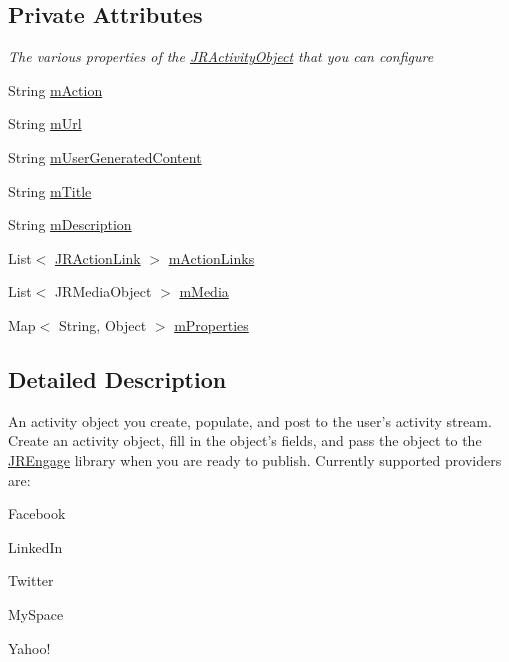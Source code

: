 \subsection*{Private Attributes}
\begin{Indent}{\bf }\par
{\em \label{_amgrpd41d8cd98f00b204e9800998ecf8427e}
 The various properties of the \hyperlink{classcom_1_1janrain_1_1android_1_1engage_1_1types_1_1_j_r_activity_object}{JRActivityObject} that you can configure }\begin{DoxyCompactItemize}
\item 
String \hyperlink{classcom_1_1janrain_1_1android_1_1engage_1_1types_1_1_j_r_activity_object_a23a0fef34f1a97a5566ae77ab6ee7d70}{mAction}
\item 
String \hyperlink{classcom_1_1janrain_1_1android_1_1engage_1_1types_1_1_j_r_activity_object_ab34fa6a32bb5e2724ccf38e29b8deedb}{mUrl}
\item 
String \hyperlink{classcom_1_1janrain_1_1android_1_1engage_1_1types_1_1_j_r_activity_object_ae94df254bffa6663d441027d7d8275c0}{mUserGeneratedContent}
\item 
String \hyperlink{classcom_1_1janrain_1_1android_1_1engage_1_1types_1_1_j_r_activity_object_a6a07e9575c466f0cfeb02907ae8d0973}{mTitle}
\item 
String \hyperlink{classcom_1_1janrain_1_1android_1_1engage_1_1types_1_1_j_r_activity_object_a6393a44879537429fc8269dda0086f20}{mDescription}
\item 
List$<$ \hyperlink{classcom_1_1janrain_1_1android_1_1engage_1_1types_1_1_j_r_action_link}{JRActionLink} $>$ \hyperlink{classcom_1_1janrain_1_1android_1_1engage_1_1types_1_1_j_r_activity_object_a9808cd0aa65b882929ba8be9a974b496}{mActionLinks}
\item 
List$<$ JRMediaObject $>$ \hyperlink{classcom_1_1janrain_1_1android_1_1engage_1_1types_1_1_j_r_activity_object_a3d89cbb011a9839da0b559556acad5f3}{mMedia}
\item 
Map$<$ String, Object $>$ \hyperlink{classcom_1_1janrain_1_1android_1_1engage_1_1types_1_1_j_r_activity_object_afd9064d65c67347bee51e205abccbb00}{mProperties}
\end{DoxyCompactItemize}
\end{Indent}


\subsection{Detailed Description}
An activity object you create, populate, and post to the user's activity stream. Create an activity object, fill in the object's fields, and pass the object to the \hyperlink{classcom_1_1janrain_1_1android_1_1engage_1_1_j_r_engage}{JREngage} library when you are ready to publish. Currently supported providers are:
\begin{DoxyItemize}
\item Facebook
\item LinkedIn
\item Twitter
\item MySpace
\item Yahoo!
\end{DoxyItemize}

